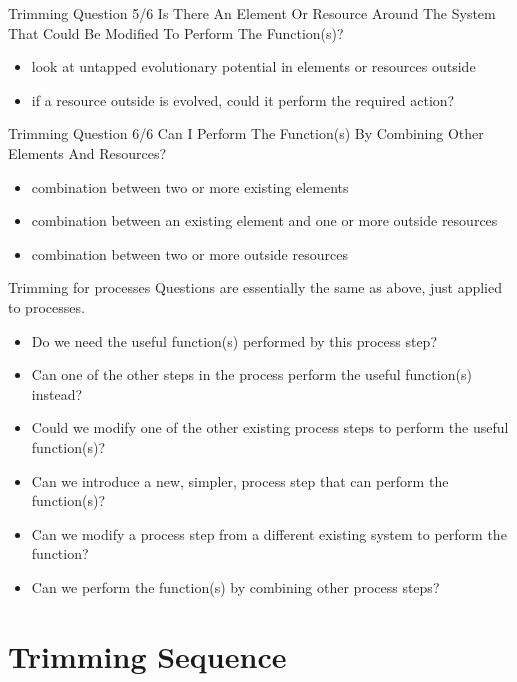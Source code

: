 \documentclass{beamer}
\begin{document}
	
	\begin{frame}{Trimming Question 5/6}
		Is There An Element Or Resource Around The System That Could Be Modified To Perform The Function(s)?
		\begin{itemize}
			\item look at untapped evolutionary potential in elements or resources outside
			\item if a resource outside is evolved, could it perform the required action?
		\end{itemize}
	\end{frame}
	
	\begin{frame}{Trimming Question 6/6}
		Can I Perform The Function(s) By Combining Other Elements And Resources?
		\begin{itemize}
			\item combination between two or more existing elements
			\item combination between an existing element and one or more outside resources
			\item combination between two or more outside resources
		\end{itemize}
	\end{frame}
	

	\begin{frame}{Trimming for processes}
		Questions are essentially the same as above, just applied to processes.
		\begin{itemize}
			\item Do we need the useful function(s) performed by this process step?
			\item Can one of the other steps in the process perform the useful function(s) instead?
			\item Could we modify one of the other existing process steps to perform the useful function(s)?
			\item Can we introduce a new, simpler, process step that can perform the function(s)?
			\item Can we modify a process step from a different existing system to perform the function?
			\item Can we perform the function(s) by combining other process steps?
		\end{itemize}
	\end{frame}
	
	
	\section{Trimming Sequence}
	
\end{document}
